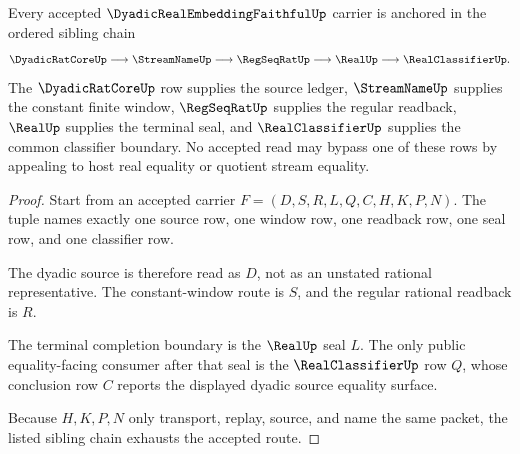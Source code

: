 \begin{theorem}
\label{thm:dyadic-real-embedding-faithful-sibling-anchors}
Every accepted $\DyadicRealEmbeddingFaithfulUp$ carrier is anchored in the ordered sibling chain
$$
\DyadicRatCoreUp \longrightarrow \StreamNameUp \longrightarrow \RegSeqRatUp \longrightarrow \RealUp \longrightarrow \RealClassifierUp .
$$
The $\DyadicRatCoreUp$ row supplies the source ledger, $\StreamNameUp$ supplies the constant finite window, $\RegSeqRatUp$ supplies the regular readback, $\RealUp$ supplies the terminal seal, and $\RealClassifierUp$ supplies the common classifier boundary. No accepted read may bypass one of these rows by appealing to host real equality or quotient stream equality.
\end{theorem}
\begin{proof}
Start from an accepted carrier $F=(D,S,R,L,Q,C,H,K,P,N)$. The tuple names exactly one source row, one window row, one readback row, one seal row, and one classifier row.

The dyadic source is therefore read as $D$, not as an unstated rational representative. The constant-window route is $S$, and the regular rational readback is $R$.

The terminal completion boundary is the $\RealUp$ seal $L$. The only public equality-facing consumer after that seal is the $\RealClassifierUp$ row $Q$, whose conclusion row $C$ reports the displayed dyadic source equality surface.

Because $H,K,P,N$ only transport, replay, source, and name the same packet, the listed sibling chain exhausts the accepted route.
\end{proof}

